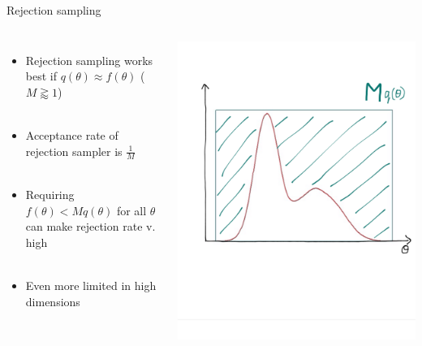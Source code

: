 \documentclass[compress]{beamer}
\begin{document}
\begin{frame}[label=sec-5-9]{Rejection sampling}
    \begin{columns}[c] 
    \begin{itemize}
        \item Rejection sampling works best if $q(\theta) \approx f(\theta)$ ($M\gtrapprox 1$)\\~\\
        \item Acceptance rate of rejection sampler is $\frac{1}{M}$\\~\\
        \item Requiring $f(\theta) < Mq(\theta)$ for all $\theta$ can make rejection rate v. high\\~\\
        \item Even more limited in high dimensions
    \end{itemize}

    \includegraphics[width=1\linewidth]{RS23.png}
\end{columns}
\end{frame}
\end{document}
